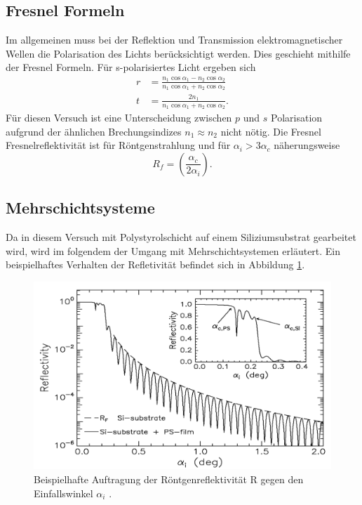 \subsection{Fresnel Formeln}
Im allgemeinen muss bei der Reflektion und Transmission elektromagnetischer Wellen die Polarisation des Lichts berücksichtigt werden. Dies geschieht mithilfe der Fresnel Formeln. Für s-polarisiertes Licht ergeben sich
\begin{align*}
    r &= \frac{n_1 \cos{\alpha_1} - n_2 \cos{\alpha_2} }{n_1 \cos{\alpha_1} + n_2 \cos{\alpha_2} }\\
    t &= \frac{2 n_1 }{n_1 \cos{\alpha_1} + n_2 \cos{\alpha_2} }.
\end{align*}
Für diesen Versuch ist eine Unterscheidung zwischen $p$ und $s$ Polarisation aufgrund der ähnlichen Brechungsindizes $n_1 \approx n_2$ nicht nötig.
Die Fresnel Fresnelreflektivität ist für Röntgenstrahlung und für $ \alpha_i > 3\alpha_c$ näherungsweise
\begin{equation*}
  R_f = \left( \frac{\alpha_c}{2 \alpha_i} \right)  .
\end{equation*}

\subsection{Mehrschichtsysteme}
Da in diesem Versuch mit Polystyrolschicht auf einem Siliziumsubstrat gearbeitet wird, wird im folgendem
der Umgang mit Mehrschichtsystemen erläutert. Ein beispielhaftes Verhalten der Refletivität befindet sich in Abbildung \ref{fig:reflectivity}.

\begin{figure}[H]
    \centering
    \includegraphics[width = 0.8 \textwidth]{content/images/reflectivity.png}
    \caption{Beispielhafte Auftragung der Röntgenreflektivität R gegen den Einfallswinkel $\alpha_i$ \cite{e1}. }
    \label{fig:reflectivity}
\end{figure}


